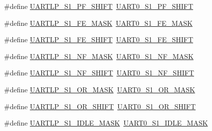 \begin{DoxyCompactItemize}
\item 
\#define \hyperlink{group___backward___compatibility___symbols_ga3364f49f1cc96aeb4df770a1e2386bbe}{U\+A\+R\+T\+L\+P\+\_\+\+S1\+\_\+\+P\+F\+\_\+\+S\+H\+I\+FT}~\hyperlink{group___u_a_r_t0___register___masks_ga28bf9a70a8a7b24b889512625d6df39d}{U\+A\+R\+T0\+\_\+\+S1\+\_\+\+P\+F\+\_\+\+S\+H\+I\+FT}
\item 
\#define \hyperlink{group___backward___compatibility___symbols_gada862f5e1e23eb050abaa6542986b29b}{U\+A\+R\+T\+L\+P\+\_\+\+S1\+\_\+\+F\+E\+\_\+\+M\+A\+SK}~\hyperlink{group___u_a_r_t0___register___masks_ga1c5be37bf4810fa33dc4a55ff08bb330}{U\+A\+R\+T0\+\_\+\+S1\+\_\+\+F\+E\+\_\+\+M\+A\+SK}
\item 
\#define \hyperlink{group___backward___compatibility___symbols_ga7da4840dcbf8ee4f76867052d4b2be53}{U\+A\+R\+T\+L\+P\+\_\+\+S1\+\_\+\+F\+E\+\_\+\+S\+H\+I\+FT}~\hyperlink{group___u_a_r_t0___register___masks_ga7875ba67c717eabba8e99c077b3ed956}{U\+A\+R\+T0\+\_\+\+S1\+\_\+\+F\+E\+\_\+\+S\+H\+I\+FT}
\item 
\#define \hyperlink{group___backward___compatibility___symbols_gadb12f094eea34062c806a23793565545}{U\+A\+R\+T\+L\+P\+\_\+\+S1\+\_\+\+N\+F\+\_\+\+M\+A\+SK}~\hyperlink{group___u_a_r_t0___register___masks_ga8d428cf6cbd42d46556eb94a1ba90c96}{U\+A\+R\+T0\+\_\+\+S1\+\_\+\+N\+F\+\_\+\+M\+A\+SK}
\item 
\#define \hyperlink{group___backward___compatibility___symbols_ga92f53755733ec53ddfe0179c6d1174f4}{U\+A\+R\+T\+L\+P\+\_\+\+S1\+\_\+\+N\+F\+\_\+\+S\+H\+I\+FT}~\hyperlink{group___u_a_r_t0___register___masks_ga345c1c8f761fe45de1be741a581f298b}{U\+A\+R\+T0\+\_\+\+S1\+\_\+\+N\+F\+\_\+\+S\+H\+I\+FT}
\item 
\#define \hyperlink{group___backward___compatibility___symbols_ga51bf26e7fb5a1b387284db20561def28}{U\+A\+R\+T\+L\+P\+\_\+\+S1\+\_\+\+O\+R\+\_\+\+M\+A\+SK}~\hyperlink{group___u_a_r_t0___register___masks_gafe263b65f56ebb135d82f6f380d92503}{U\+A\+R\+T0\+\_\+\+S1\+\_\+\+O\+R\+\_\+\+M\+A\+SK}
\item 
\#define \hyperlink{group___backward___compatibility___symbols_gab29dfd93536cc8364a09450d30d8e6fc}{U\+A\+R\+T\+L\+P\+\_\+\+S1\+\_\+\+O\+R\+\_\+\+S\+H\+I\+FT}~\hyperlink{group___u_a_r_t0___register___masks_ga30b721ac10d936a50f083dd8edf63793}{U\+A\+R\+T0\+\_\+\+S1\+\_\+\+O\+R\+\_\+\+S\+H\+I\+FT}
\item 
\#define \hyperlink{group___backward___compatibility___symbols_ga96b6b702c4342c4af5004fb48b83efa7}{U\+A\+R\+T\+L\+P\+\_\+\+S1\+\_\+\+I\+D\+L\+E\+\_\+\+M\+A\+SK}~\hyperlink{group___u_a_r_t0___register___masks_gab6f26cdc2089161970bbd6d77daf345b}{U\+A\+R\+T0\+\_\+\+S1\+\_\+\+I\+D\+L\+E\+\_\+\+M\+A\+SK}

\end{DoxyCompactItemize}
